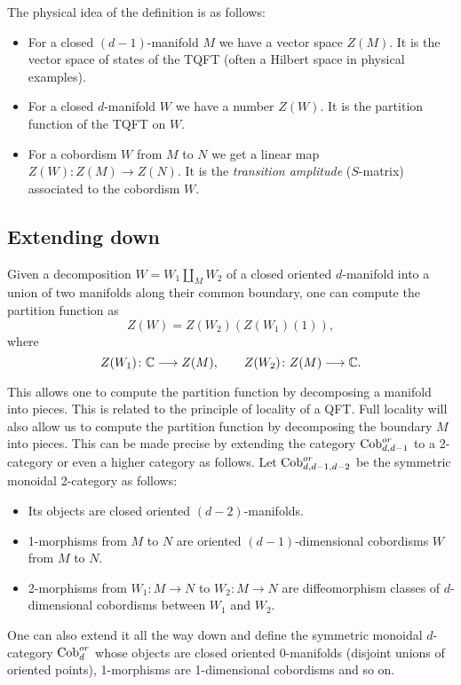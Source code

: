 The physical idea of the definition is as follows:
\begin{itemize}
	\item For a closed $(d-1)$-manifold $M$ we have a vector space $Z(M)$. It is the vector space of states of the TQFT (often a Hilbert space in physical examples).
	
	\item For a closed $d$-manifold $W$ we have a number $Z(W)$. It is the partition function of the TQFT on $W$.
	
	\item For a cobordism $W$ from $M$ to $N$ we get a linear map $Z(W)\colon Z(M)\rightarrow Z(N)$. It is the \emph{transition amplitude} ($S$-matrix) associated to the cobordism $W$.
\end{itemize}

\subsection{Extending down}

Given a decomposition $W = W_1\coprod_M W_2$ of a closed oriented $d$-manifold into a union of two manifolds along their common boundary, one can compute the partition function as
\[Z(W) = Z(W_2)(Z(W_1)(1)),\]
where
\[Z(W_1)\colon \mathbb{C}\longrightarrow Z(M),\qquad Z(W_2)\colon Z(M)\longrightarrow \mathbb{C}.\]

This allows one to compute the partition function by decomposing a manifold into pieces. This is related to the principle of locality of a QFT. Full locality will also allow us to compute the partition function by decomposing the boundary $M$ into pieces. This can be made precise by extending the category $\mathrm{Cob}^{or}_{d, d-1}$ to a 2-category or even a higher category as follows. Let $\mathrm{Cob}^{or}_{d, d-1, d-2}$ be the symmetric monoidal 2-category as follows:
\begin{itemize}
	\item Its objects are closed oriented $(d-2)$-manifolds.
	\item 1-morphisms from $M$ to $N$ are oriented $(d-1)$-dimensional cobordisms $W$ from $M$ to $N$.
	\item 2-morphisms from $W_1\colon M\rightarrow N$ to $W_2\colon M\rightarrow N$ are diffeomorphism classes of $d$-dimensional cobordisms between $W_1$ and $W_2$.
\end{itemize}

One can also extend it all the way down and define the symmetric monoidal $d$-category $\mathrm{Cob}^{or}_d$ whose objects are closed oriented 0-manifolds (disjoint unions of oriented points), 1-morphisms are 1-dimensional cobordisms and so on.

